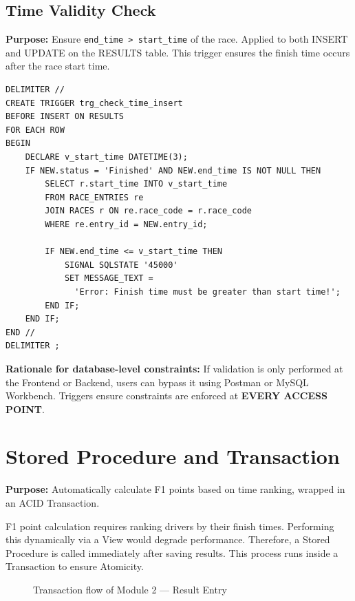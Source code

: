 \documentclass[12pt, a4paper]{report}
\begin{document}
\subsection{Time Validity Check}
\textbf{Purpose:} Ensure \texttt{end\_time > start\_time} of the race. Applied to both INSERT and UPDATE on the RESULTS table.
This trigger ensures the finish time occurs after the race start time.
\begin{lstlisting}[caption={Trigger --- trg\_check\_time\_insert}]
DELIMITER //
CREATE TRIGGER trg_check_time_insert
BEFORE INSERT ON RESULTS
FOR EACH ROW
BEGIN
    DECLARE v_start_time DATETIME(3);
    IF NEW.status = 'Finished' AND NEW.end_time IS NOT NULL THEN
        SELECT r.start_time INTO v_start_time 
        FROM RACE_ENTRIES re 
        JOIN RACES r ON re.race_code = r.race_code 
        WHERE re.entry_id = NEW.entry_id;
        
        IF NEW.end_time <= v_start_time THEN
            SIGNAL SQLSTATE '45000' 
            SET MESSAGE_TEXT = 
              'Error: Finish time must be greater than start time!';
        END IF;
    END IF;
END //
DELIMITER ;
\end{lstlisting}
\textbf{Rationale for database-level constraints:} If validation is only performed at the Frontend or Backend, users can bypass it using Postman or MySQL Workbench. Triggers ensure constraints are enforced at \textbf{EVERY ACCESS POINT}.

\section{Stored Procedure and Transaction}
\textbf{Purpose:} Automatically calculate F1 points based on time ranking, wrapped in an ACID Transaction.

F1 point calculation requires ranking drivers by their finish times. Performing this dynamically via a View would degrade performance. Therefore, a Stored Procedure is called immediately after saving results. This process runs inside a Transaction to ensure Atomicity.
 \newpage
\begin{figure}[h]
\centering
{}
\caption{Transaction flow of Module 2 --- Result Entry}
\end{figure}
\end{document}
